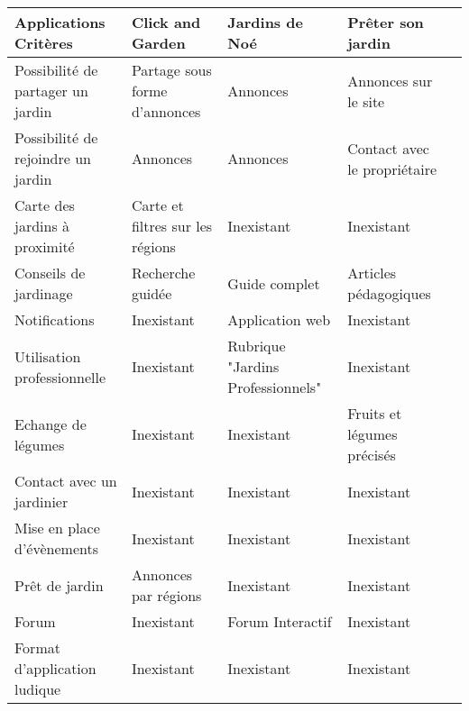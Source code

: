 \documentclass{article}
\begin{document}
\begin{tabular}{|p{3cm}|p{3cm}|p{3cm}|p{3cm}|p{3cm}|}
    \hline 
    Applications Critères & Click and Garden & Jardins de Noé & Prêter son jardin
    \\ \hline
    Possibilité de partager un jardin & Partage sous forme d’annonces & Annonces & Annonces sur le site
    \\ \hline
   Possibilité de rejoindre un jardin & Annonces & Annonces & Contact avec le propriétaire  
    \\ \hline
   Carte des jardins à proximité & Carte et filtres sur les régions & Inexistant & Inexistant
    \\ \hline
   Conseils de jardinage & Recherche guidée & Guide complet & Articles pédagogiques
    \\ \hline
    Notifications & Inexistant & Application web & Inexistant 
    \\ \hline
    Utilisation professionnelle & Inexistant & Rubrique "Jardins Professionnels" & Inexistant
    \\ \hline
    Echange de légumes & Inexistant & Inexistant & Fruits et légumes précisés
    \\ \hline
    Contact avec un jardinier & Inexistant & Inexistant & Inexistant  
    \\ \hline
   Mise en place d’évènements & Inexistant & Inexistant & Inexistant
    \\ \hline
    Prêt de jardin & Annonces par régions & Inexistant & Inexistant
    \\ \hline
   Forum & Inexistant & Forum Interactif & Inexistant 
    \\ \hline
    Format d'application ludique & Inexistant & Inexistant & Inexistant 
    \\ \hline
\end{tabular}
\end{document}
